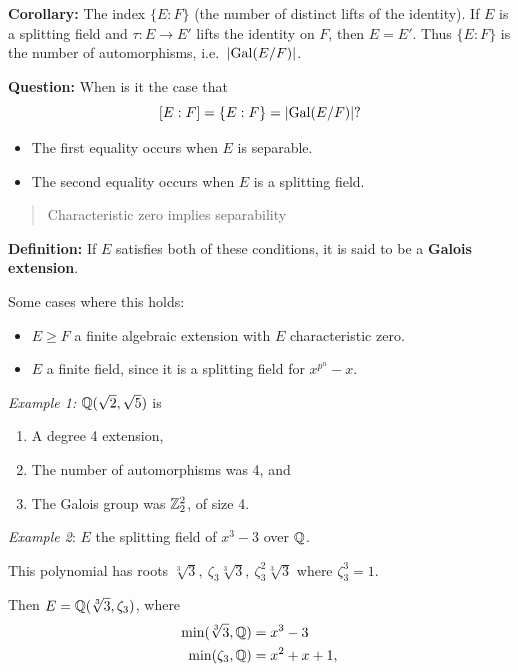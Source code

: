 \textbf{Corollary:} The index \(\{ E: F \}\) (the number of distinct
lifts of the identity). If \(E\) is a splitting field and
\(\tau:E \to E'\) lifts the identity on \(F\), then \(E = E'\). Thus
\(\{ E : F \}\) is the number of automorphisms,
i.e.~\({\left\lvert {\mathrm{Gal}(E/F)} \right\rvert}\).

\textbf{Question:} When is it the case that \[
[E: F] = \{E: F\} = {\left\lvert {\mathrm{Gal}(E/F)} \right\rvert}?
\]

\begin{itemize}
\item
  The first equality occurs when \(E\) is separable.
\item
  The second equality occurs when \(E\) is a splitting field.
\end{itemize}

\begin{quote}
Characteristic zero implies separability
\end{quote}

\textbf{Definition:} If \(E\) satisfies both of these conditions, it is
said to be a \textbf{Galois extension}.

Some cases where this holds:

\begin{itemize}
\item
  \(E \geq F\) a finite algebraic extension with \(E\) characteristic
  zero.
\item
  \(E\) a finite field, since it is a splitting field for
  \(x^{p^n} - x\).
\end{itemize}

\emph{Example 1:} \({\mathbb{Q}}(\sqrt 2, \sqrt 5)\) is

\begin{enumerate}
\def\labelenumi{\arabic{enumi}.}
\item
  A degree 4 extension,
\item
  The number of automorphisms was 4, and
\item
  The Galois group was \({\mathbb{Z}}_2^2\), of size 4.
\end{enumerate}

\emph{Example 2}: \(E\) the splitting field of \(x^3 - 3\) over \({\mathbb{Q}}\).

This polynomial has roots
\(\sqrt[3] 3,~ \zeta_3 \sqrt[3] 3,~ \zeta_3^2 \sqrt[3] 3\) where
\(\zeta_3^3 = 1\).

Then \(E = {\mathbb{Q}}(\sqrt[3] 3, \zeta_3)\), where \begin{align*}
\min(\sqrt[3] 3, {\mathbb{Q}}) &= x^3 - 3 \\
\min(\zeta_3, {\mathbb{Q}}) &= x^2 + x + 1
,\end{align*}

